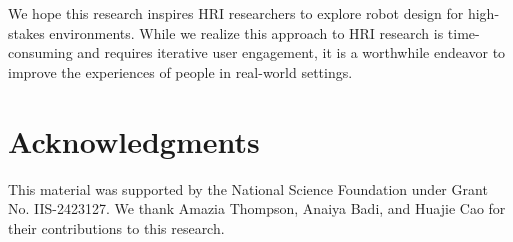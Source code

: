 We hope this research inspires HRI researchers to explore robot design for high-stakes environments. 
While we realize this approach to HRI research is time-consuming and requires iterative user engagement, it is a worthwhile endeavor to improve the experiences of people in real-world settings. %

\section{Acknowledgments}

This material was supported by the National Science Foundation under Grant No.
IIS-2423127. We thank Amazia Thompson, Anaiya Badi, and Huajie Cao for their contributions to this research.

 